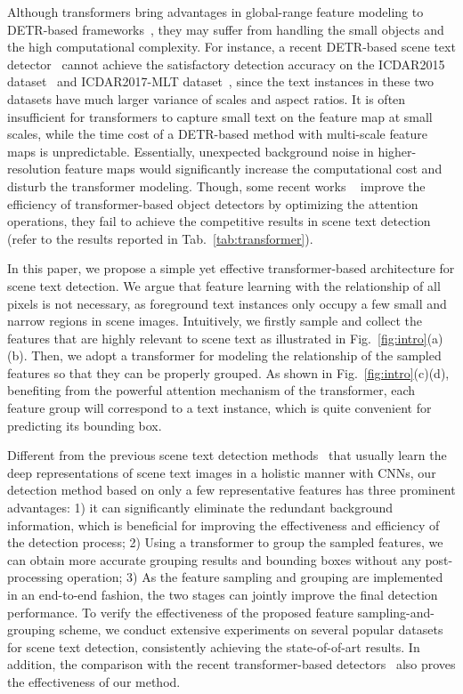 \documentclass[10pt,twocolumn,letterpaper]{article}
\begin{document}
Although transformers bring advantages in global-range feature modeling to DETR-based frameworks~\cite{carion2020detr}, they may suffer from handling the small objects and the high computational complexity. For instance, a recent DETR-based scene text detector~\cite{raisi2021transformer} cannot achieve the satisfactory detection accuracy on the ICDAR2015 dataset~\cite{ic15} and ICDAR2017-MLT dataset~\cite{MLT17}, since the text instances in these two datasets have much larger variance of scales and aspect ratios. It is often insufficient for transformers to capture small text on the feature map at small scales, while the time cost of a DETR-based method with multi-scale feature maps is unpredictable. Essentially, unexpected background noise in higher-resolution feature maps would significantly increase the computational cost and disturb the transformer modeling.
Though, some recent works ~\cite{zhu2020deformable, meng2021conditional} improve the efficiency of transformer-based object detectors by optimizing the attention operations, they fail to achieve the competitive results in scene text detection (refer to the results reported in Tab.~\ref{tab:transformer}).

In this paper, we propose a simple yet effective transformer-based architecture for scene text detection. We argue that feature learning with the relationship of all pixels is not necessary, as foreground text instances only occupy a few small and narrow regions in scene images.
Intuitively, we firstly sample and collect the features that are highly relevant to scene text as illustrated in Fig.~\ref{fig:intro}(a)(b). Then, we adopt a transformer for modeling the relationship of the sampled features so that they can be properly grouped. As shown in Fig.~\ref{fig:intro}(c)(d), benefiting from the powerful attention mechanism of the transformer, each feature group will correspond to a text instance, which is quite convenient for predicting its bounding box.

Different from the previous scene text detection methods~\cite{EAST,DB,RRG-Net,PSE-Net,CRAFT,textboxes++} that usually learn the deep representations of scene text images in a holistic manner with CNNs, our detection method based on only a few representative features has three prominent advantages:
1) it can significantly eliminate the redundant background information, which is beneficial for improving the effectiveness and efficiency of the detection process;
2) Using a transformer to group the sampled features, we can obtain more accurate grouping results and bounding boxes without any post-processing operation;
3) As the feature sampling and grouping are implemented in an end-to-end fashion, the two stages can jointly improve the final detection performance.
To verify the effectiveness of the proposed feature sampling-and-grouping scheme, we conduct extensive experiments on several popular datasets~\cite{ic15, TD500, MLT17, MTWI, totaltext, ctw1500} for scene text detection, consistently achieving the state-of-of-art results. In addition, the comparison with the recent transformer-based detectors~\cite{carion2020detr,meng2021conditional,zhu2020deformable,raisi2021transformer} also proves the effectiveness of our method.
\end{document}
